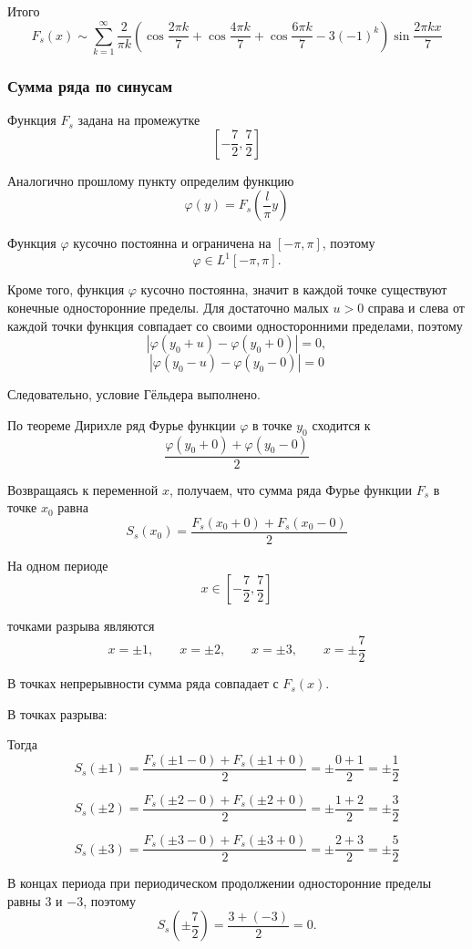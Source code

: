 \documentclass[12pt,a4paper]{article}
\begin{document}
Итого
\[
F_s(x)\sim
\sum_{k=1}^{\infty}
\frac2{\pi k}
\left(
\cos\frac{2\pi k}{7}
+
\cos\frac{4\pi k}{7}
+
\cos\frac{6\pi k}{7}
-
3(-1)^k
\right)
\sin\frac{2\pi kx}{7}
\]

\subsubsection*{Сумма ряда по синусам}

Функция \(F_s\) задана на промежутке
\[
\left[-\frac72,\frac72\right]
\]

Аналогично прошлому пункту определим функцию
\[
\varphi(y)=F_s\left(\frac{l}{\pi}y\right)
\]

Функция \(\varphi\) кусочно постоянна и ограничена на \([-\pi,\pi]\),
поэтому
\[
\varphi\in L^1[-\pi,\pi].
\]

Кроме того, функция \(\varphi\) кусочно постоянна, значит в каждой точке
существуют конечные односторонние пределы. Для достаточно малых \(u>0\)
справа и слева от каждой точки функция совпадает со своими односторонними
пределами, поэтому
\[
|\varphi(y_0+u)-\varphi(y_0+0)|=0,
\]
\[
|\varphi(y_0-u)-\varphi(y_0-0)|=0
\]

Следовательно, условие Гёльдера выполнено.

По теореме Дирихле ряд Фурье функции \(\varphi\) в точке \(y_0\) сходится к
\[
\frac{\varphi(y_0+0)+\varphi(y_0-0)}{2}
\]

Возвращаясь к переменной \(x\), получаем, что сумма ряда Фурье функции
\(F_s\) в точке \(x_0\) равна
\[
S_s(x_0)=
\frac{F_s(x_0+0)+F_s(x_0-0)}{2}
\]

На одном периоде
\[
x\in\left[-\frac72,\frac72\right]
\]

точками разрыва являются
\[
x=\pm1,\qquad x=\pm2,\qquad x=\pm3,\qquad x=\pm\frac72
\]

В точках непрерывности сумма ряда совпадает с \(F_s(x)\).

В точках разрыва:

Тогда
\[
S_s(\pm 1)=
\frac{F_s(\pm 1-0)+F_s(\pm 1+0)}{2}
=
\pm\frac{0+1}{2}
=
\pm\frac12
\]

\[
S_s(\pm 2)=
\frac{F_s(\pm 2-0)+F_s(\pm 2+0)}{2}
=
\pm\frac{1+2}{2}
=
\pm\frac32
\]

\[
S_s(\pm 3)=
\frac{F_s(\pm 3-0)+F_s(\pm 3+0)}{2}
=
\pm\frac{2+3}{2}
=
\pm\frac52
\]

В концах периода при периодическом продолжении односторонние пределы
равны \(3\) и \(-3\), поэтому
\[
S_s\left(\pm\frac72\right)=
\frac{3+(-3)}{2}
=
0.
\]
\end{document}
